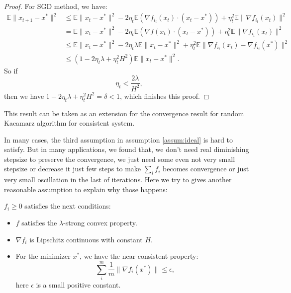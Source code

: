 \begin{proof}
	For SGD method, we have:
	\begin{align}
	\mathbb{E} \|x_{t+1} - x^*\|^2 &\le \mathbb{E} \|x_t - x^*\|^2  - 2 \eta_t \mathbb{E} (\nabla f_{i_t}(x_t) \cdot (x_t - x^*)) + \eta_t^2 \mathbb{E} \|\nabla f_{i_t}(x_t)\|^2\\ 
	&= \mathbb{E} \|x_t - x^*\|^2  - 2 \eta_t \mathbb{E} (\nabla f(x_t) \cdot (x_t - x^*))  + \eta_t^2 \mathbb{E} \|\nabla f_{i_t}(x_t)\|^2 \\
	&\le \mathbb{E} \|x_t - x^*\|^2 - 2\eta_t \lambda \mathbb{E}\|x_t - x^*\|^2 + \eta_t^2 \mathbb{E}\|\nabla f_{i_t}(x_t) - \nabla f_{i_t}(x^*)\|^2 \\
	&\le (1- 2\eta_t \lambda + \eta_t^2 H^2) \mathbb{E}\|x_t - x^*\|^2.
	\end{align} 
	So if 
	\begin{equation}
	\eta_t < \frac{2\lambda}{H^2}, 
	\end{equation}
	then we have $1- 2\eta_t \lambda + \eta_t^2 H^2 = \delta < 1$, which finishes this proof.
\end{proof}

This result can be taken as an extension for the convergence result for random Kacamarz algorithm for consistent system. 


In many cases, the third assumption in assumption \ref{assum:ideal} is hard to satisfy. But in many applications, we found that, we don't need real diminishing stepsize to preserve the convergence, we just need some even not very small stepsize or decrease it just few steps to make $\sum_i f_i$ becomes convergence or just very small oscillation in the last of iterations.  Here we try to gives another reasonable assumption to explain why those happens:
\begin{assumption}\label{assum:nearideal}
	$f_i \ge 0$ satisfies the next conditions:
	\begin{itemize}
		\item $ f$ satisfies the $\lambda$-strong convex property.
		\item $\nabla f_i$ is Lipschitz continuous with constant $H$.
		\item For the minimizer $x^*$, we have the near consistent property:
		\begin{equation}
		\sum_{i}^m\frac{1}{m}\|\nabla f_i(x^*)\| \le \epsilon,
		\end{equation}
		here $\epsilon$ is a small positive constant. 
	\end{itemize}
\end{assumption}

